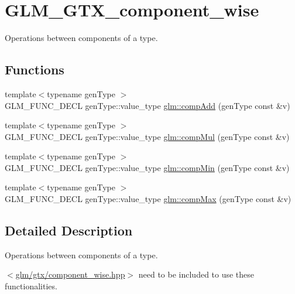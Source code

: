 \hypertarget{group__gtx__component__wise}{}\section{G\+L\+M\+\_\+\+G\+T\+X\+\_\+component\+\_\+wise}
\label{group__gtx__component__wise}


Operations between components of a type.  


\subsection*{Functions}
\begin{DoxyCompactItemize}
\item 
{\footnotesize template$<$typename gen\+Type $>$ }\\G\+L\+M\+\_\+\+F\+U\+N\+C\+\_\+\+D\+E\+C\+L gen\+Type\+::value\+\_\+type \hyperlink{group__gtx__component__wise_gaf71833350e15e74d31cbf8a3e7f27051}{glm\+::comp\+Add} (gen\+Type const \&v)
\item 
{\footnotesize template$<$typename gen\+Type $>$ }\\G\+L\+M\+\_\+\+F\+U\+N\+C\+\_\+\+D\+E\+C\+L gen\+Type\+::value\+\_\+type \hyperlink{group__gtx__component__wise_gae8ab88024197202c9479d33bdc5a8a5d}{glm\+::comp\+Mul} (gen\+Type const \&v)
\item 
{\footnotesize template$<$typename gen\+Type $>$ }\\G\+L\+M\+\_\+\+F\+U\+N\+C\+\_\+\+D\+E\+C\+L gen\+Type\+::value\+\_\+type \hyperlink{group__gtx__component__wise_gab5d0832b5c7bb01b8d7395973bfb1425}{glm\+::comp\+Min} (gen\+Type const \&v)
\item 
{\footnotesize template$<$typename gen\+Type $>$ }\\G\+L\+M\+\_\+\+F\+U\+N\+C\+\_\+\+D\+E\+C\+L gen\+Type\+::value\+\_\+type \hyperlink{group__gtx__component__wise_gabfa4bb19298c8c73d4217ba759c496b6}{glm\+::comp\+Max} (gen\+Type const \&v)
\end{DoxyCompactItemize}


\subsection{Detailed Description}
Operations between components of a type. 

$<$\hyperlink{component__wise_8hpp}{glm/gtx/component\+\_\+wise.\+hpp}$>$ need to be included to use these functionalities. 

